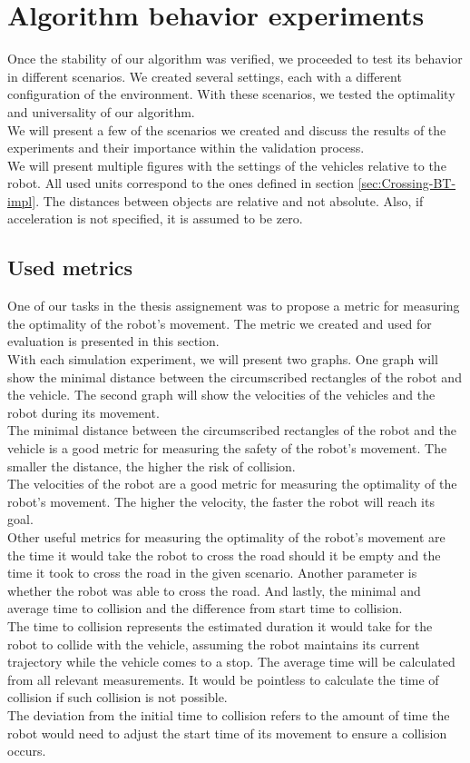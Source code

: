 \section{Algorithm behavior experiments}
    Once the stability of our algorithm was verified, we proceeded to test its behavior in different scenarios. We created several settings, each with a different configuration of the environment. With these scenarios, we tested the optimality and universality of our algorithm.\\
    We will present a few of the scenarios we created and discuss the results of the experiments and their importance within the validation process.\\
    We will present multiple figures with the settings of the vehicles relative to the robot. All used units correspond to the ones defined in section \ref{sec:Crossing-BT-impl}. The distances between objects are relative and not absolute. Also, if acceleration is not specified, it is assumed to be zero.\\
    \subsection{Used metrics}
    \label{sec:metrics}
        One of our tasks in the thesis assignement was to propose a metric for measuring the optimality of the robot's movement. The metric we created and used for evaluation is presented in this section.\\
        With each simulation experiment, we will present two graphs. One graph will show the minimal distance between the circumscribed rectangles of the robot and the vehicle. The second graph will show the velocities of the vehicles and the robot during its movement.\\
        The minimal distance between the circumscribed rectangles of the robot and the vehicle is a good metric for measuring the safety of the robot's movement. The smaller the distance, the higher the risk of collision.\\
        The velocities of the robot are a good metric for measuring the optimality of the robot's movement. The higher the velocity, the faster the robot will reach its goal.\\
        Other useful metrics for measuring the optimality of the robot's movement are the time it would take the robot to cross the road should it be empty and the time it took to cross the road in the given scenario. Another parameter is whether the robot was able to cross the road. And lastly, the minimal and average time to collision and the difference from start time to collision.\\
        The time to collision represents the estimated duration it would take for the robot to collide with the vehicle, assuming the robot maintains its current trajectory while the vehicle comes to a stop. The average time will be calculated from all relevant measurements. It would be pointless to calculate the time of collision if such collision is not possible.\\
        The deviation from the initial time to collision refers to the amount of time the robot would need to adjust the start time of its movement to ensure a collision occurs.
